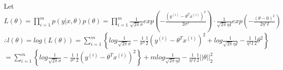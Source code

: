 \begin{answer}\\
Let $L(\theta)=\prod_{i=1}^{m}p(y|x,\theta)p(\theta)=\prod_{i=1}^{m}\frac{1}{\sqrt{2 \pi}\sigma}exp(-\frac{(y^{(i)}-\theta^T x^{(i)})^2}{2 \sigma^2}) \cdot \frac{1}{\sqrt{2 \pi}\eta I} exp(- \frac{(\theta-0)^2}{2 \eta^2 I})$\\
$\therefore l(\theta)=log(L(\theta))=\sum_{i=1}^{m}\left \lbrace log \frac{1}{\sqrt{2 \pi} \sigma}-\frac{1}{\sigma^2}\frac{1}{2}(y^{(i)}-\theta^T x^{(i)})^2 + log \frac{1}{\sqrt{2 \pi}\eta I} -\frac{1}{\eta^2 I}\frac{1}{2} \theta^2 \right \rbrace$\\
$=\sum_{i=1}^{m}\left \lbrace log \frac{1}{\sqrt{2 \pi} \sigma}-\frac{1}{\sigma^2}\frac{1}{2}(y^{(i)}-\theta^T x^{(i)})^2 \right \rbrace + m log \frac{1}{\sqrt{2 \pi}\eta I} -\frac{1}{\eta^2 I}\frac{1}{2} ||\theta||_2^2$\\

\end{answer}
